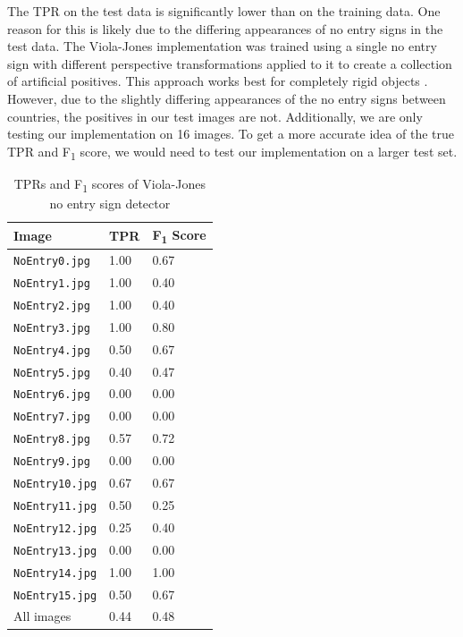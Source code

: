 \documentclass[twocolumn, 10pt, a4paper]{article}
\begin{document}
The TPR on the test data is significantly lower than on the training data.
One reason for this is likely due to the differing appearances of no entry signs in the test data.
The Viola-Jones implementation was trained using a single no entry sign with different perspective transformations applied to it to create a collection of artificial positives.
This approach works best for completely rigid objects \cite{training}. 
However, due to the slightly differing appearances of the no entry signs between countries, the positives in our test images are not.
Additionally, we are only testing our implementation on 16 images.
To get a more accurate idea of the true TPR and F\textsubscript{1} score, we would need to test our implementation on a larger test set.




\begin{table}[htbp]
  \begin{center}
  \caption{TPRs and F\textsubscript{1} scores of Viola-Jones no entry sign detector}\label{tab:vj}
  \begin{tabular}{l | l l} 
    \hline\hline
    Image&TPR&F\textsubscript{1} Score\\
    \hline
    \texttt{NoEntry0.jpg}&1.00&0.67\\ 
    \texttt{NoEntry1.jpg}&1.00&0.40\\ 
    \texttt{NoEntry2.jpg}&1.00&0.40\\ 
    \texttt{NoEntry3.jpg}&1.00&0.80\\ 
    \texttt{NoEntry4.jpg}&0.50&0.67\\ 
    \texttt{NoEntry5.jpg}&0.40&0.47\\ 
    \texttt{NoEntry6.jpg}&0.00&0.00\\ 
    \texttt{NoEntry7.jpg}&0.00&0.00\\
    \texttt{NoEntry8.jpg}&0.57&0.72\\ 
    \texttt{NoEntry9.jpg}&0.00&0.00\\ 
    \texttt{NoEntry10.jpg}&0.67&0.67\\ 
    \texttt{NoEntry11.jpg}&0.50&0.25\\ 
    \texttt{NoEntry12.jpg}&0.25&0.40\\ 
    \texttt{NoEntry13.jpg}&0.00&0.00\\ 
    \texttt{NoEntry14.jpg}&1.00&1.00\\ 
    \texttt{NoEntry15.jpg}&0.50&0.67\\ 
    \hdashline
    All images&0.44&0.48\\ 
    \hline
  \end{tabular}
  \end{center}
\end{table} 
\end{document}
